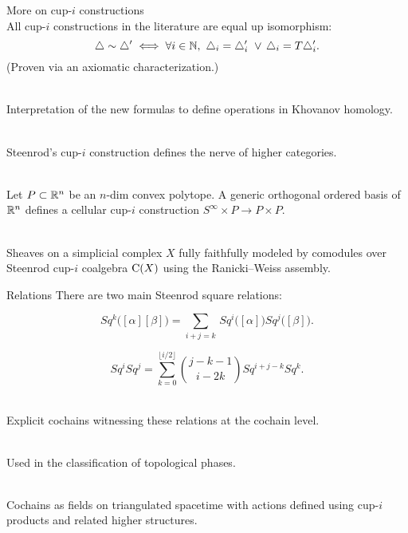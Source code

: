 \begin{frame}{More on cup-$i$ constructions}
	\pause
	 \\
	All cup-$i$ constructions in the literature are equal up isomorphism:
	\vskip -7.5pt
	\[
	\triangle \sim \triangle^\prime \iff \forall i \in \mathbb{N}, \ \triangle_i = \triangle_i^\prime \ \vee \, \triangle_i = T \triangle_i^\prime.
	\]
	\vskip -3pt
	(Proven via an axiomatic characterization.)

	\medskip\pause
	 \\
	Interpretation of the new formulas to define operations in Khovanov homology.

	\medskip\pause
	 \\
	Steenrod's cup-$i$ construction defines the nerve of higher categories.

	\medskip\pause
	 \\
	Let $P \subset \mathbb{R}^n$ be an $n$-dim convex polytope.
	A generic orthogonal ordered basis of $\mathbb{R}^n$ defines a cellular cup-$i$ construction $S^\infty \times P \to P \times P$.

	\medskip\pause
	 \\
	Sheaves on a simplicial complex $X$ fully faithfully modeled by comodules over Steenrod cup-$i$ coalgebra $\operatorname{C}(X)$ using the Ranicki--Weiss assembly.
\end{frame}

\begin{frame}{Relations}
	\pause
	There are two main Steenrod square relations:

	\bigskip\pause
	\vspace*{-5pt}
	\begin{equation*}
		Sq^k \big( [\alpha] [\beta] \big) =
		\sum_{i+j=k} \, Sq^i\big([\alpha]\big) Sq^j\big([\beta]\big).
	\end{equation*}

	\pause
	\vspace*{-5pt}
	\begin{equation*}
		Sq^i Sq^j =
		\sum_{k=0}^{\lfloor i/2 \rfloor} \binom{j-k-1}{i-2k} Sq^{i+j-k} Sq^k.
	\end{equation*}

	\medskip\pause
	 \\
	Explicit cochains witnessing these relations at the cochain level.

	\medskip\pause
	 \\
	Used in the classification of topological phases.

	\medskip\pause
	 \\
	Cochains as fields on triangulated spacetime with actions defined using cup-$i$ products and related higher structures.
\end{frame}